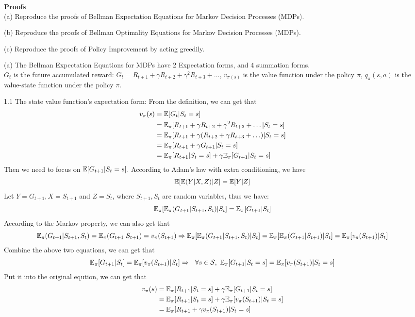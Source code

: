 \begin{homeworkProblem}
\textbf{Proofs} \\
(a) Reproduce the proofs of Bellman Expectation Equations for Markov Decision Processes (MDPs).

(b) Reproduce the proofs of Bellman Optimality Equations for Markov Decision Processes (MDPs).

(c) Reproduce the proofs of Policy Improvement by acting greedily.

\solution

(a) The Bellman Expectation Equations for MDPs have $2$ Expectation forms, and $4$ summation forms. \\
$G_t$ is the future accumulated reward: $G_t = R_{t+1} + \gamma R_{t+2} + \gamma^2 R_{t+3} + \ldots$, $v_{\pi(s)}$ is the value function under the policy $\pi$, $q_{\pi}(s, a)$ is the value-state function under the policy $\pi$.

1.1 The state value function's expectation form: From the definition, we can get that
\begin{align*}
v_{\pi}(s) &= \mathbb{E}[G_t|S_t=s] \\
&= \mathbb{E}_{\pi}[R_{t+1} + \gamma R_{t+2} + \gamma^2 R_{t+3} + \ldots | S_t=s] \\
&= \mathbb{E}_{\pi}[R_{t+1} + \gamma (R_{t+2} + \gamma R_{t+3} + \ldots) | S_t=s] \\
&= \mathbb{E}_{\pi}[R_{t+1} + \gamma G_{t+1} | S_t=s] \\
&= \mathbb{E}_{\pi}[R_{t+1}| S_t=s] + \gamma \mathbb{E}_{\pi}[G_{t+1} | S_t=s]
\end{align*}
Then we need to focus on $\mathbb{E}[G_{t+1} | S_t=s]$. According to Adam's law with extra conditioning, we have
$$\mathbb{E}[\mathbb{E}(Y|X,Z)|Z] = \mathbb{E}[Y|Z]$$
Let $Y=G_{t+1}, X=S_{t+1}$ and $Z=S_t$, where $S_{t+1}, S_t$ are random variables, thus we have:
$$\mathbb{E}_{\pi}[\mathbb{E}_{\pi}(G_{t+1}|S_{t+1},S_t)|S_t] = \mathbb{E}_{\pi}[G_{t+1}|S_t]$$
According to the Markov property, we can also get that
$$\mathbb{E}_{\pi}(G_{t+1}|S_{t+1},S_t)=\mathbb{E}_{\pi}(G_{t+1}|S_{t+1})=v_{\pi}(S_{t+1}) \Rightarrow \mathbb{E}_{\pi}[\mathbb{E}_{\pi}(G_{t+1}|S_{t+1},S_t)|S_t]=\mathbb{E}_{\pi}[\mathbb{E}_{\pi}(G_{t+1}|S_{t+1})|S_t]=\mathbb{E}_{\pi}[v_{\pi}(S_{t+1})|S_t]$$
Combine the above two equations, we can get that
$$\E_{\pi}[G_{t+1}|S_t] = \E_{\pi}[v_{\pi}(S_{t+1})|S_t]\Rightarrow \ \ \forall s\in\mS,\ \E_{\pi}[G_{t+1}|S_t=s] = \E_{\pi}[v_{\pi}(S_{t+1})|S_t=s]$$
Put it into the original eqution, we can get that
\begin{align*}
v_{\pi}(s) &= \mathbb{E}_{\pi}[R_{t+1}| S_t=s] + \gamma \mathbb{E}_{\pi}[G_{t+1} | S_t=s] \\
&= \mathbb{E}_{\pi}[R_{t+1}|S_t=s] + \gamma \mathbb{E}_{\pi}[v_{\pi}(S_{t+1}) |S_t = s] \\
&= \mathbb{E}_{\pi}[R_{t+1} + \gamma v_{\pi}(S_{t+1}) |S_t = s]
\end{align*}


\end{homeworkProblem}
